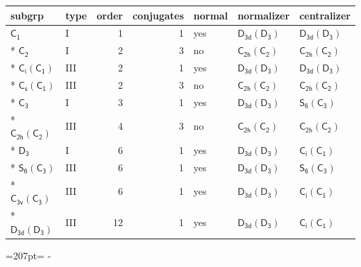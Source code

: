 \documentclass[10pt,a4paper]{article}
\newcommand{\needspace}[1]{\par\penalty-100\begingroup\dimen0=#1\relax\dimen2=\pagegoal
  \advance\dimen2-\pagetotal\ifdim\dimen0>\dimen2\relax\ifdim\dimen2>0pt\vfil\break\fi\fi
  \endgroup}
\numberwithin{equation}{section}
\newcommand{\grp}[1]{\mathsf{#1}}
\begin{document}
{\small\begin{longtable}{@{}llrrlll@{}}\toprule
subgrp & type & order & conjugates & normal & normalizer & centralizer\\\midrule\endhead
\bottomrule\endfoot\endlastfoot
\href{../../../rotation/data/pdf/C1.pdf}{$\grp{C_{1}}$} & I & 1 & 1 & yes & \href{D3d-D3.pdf}{$\grp{D_{3d}}(\grp{D_{3}})$} & \href{D3d-D3.pdf}{$\grp{D_{3d}}(\grp{D_{3}})$}\\*
\href{../../../rotation/data/pdf/C2.pdf}{$\grp{C_{2}}$} & I & 2 & 3 & no & \href{C2h-C2.pdf}{$\grp{C_{2h}}(\grp{C_{2}})$} & \href{C2h-C2.pdf}{$\grp{C_{2h}}(\grp{C_{2}})$}\\*
\href{S2-C1.pdf}{$\grp{C_{i}}(\grp{C_{1}})$} & III & 2 & 1 & yes & \href{D3d-D3.pdf}{$\grp{D_{3d}}(\grp{D_{3}})$} & \href{D3d-D3.pdf}{$\grp{D_{3d}}(\grp{D_{3}})$}\\*
\href{C1v-C1.pdf}{$\grp{C_{s}}(\grp{C_{1}})$} & III & 2 & 3 & no & \href{C2h-C2.pdf}{$\grp{C_{2h}}(\grp{C_{2}})$} & \href{C2h-C2.pdf}{$\grp{C_{2h}}(\grp{C_{2}})$}\\*
\href{../../../rotation/data/pdf/C3.pdf}{$\grp{C_{3}}$} & I & 3 & 1 & yes & \href{D3d-D3.pdf}{$\grp{D_{3d}}(\grp{D_{3}})$} & \href{S6-C3.pdf}{$\grp{S_{6}}(\grp{C_{3}})$}\\*
\href{C2h-C2.pdf}{$\grp{C_{2h}}(\grp{C_{2}})$} & III & 4 & 3 & no & \href{C2h-C2.pdf}{$\grp{C_{2h}}(\grp{C_{2}})$} & \href{C2h-C2.pdf}{$\grp{C_{2h}}(\grp{C_{2}})$}\\*
\href{../../../rotation/data/pdf/D3.pdf}{$\grp{D_{3}}$} & I & 6 & 1 & yes & \href{D3d-D3.pdf}{$\grp{D_{3d}}(\grp{D_{3}})$} & \href{S2-C1.pdf}{$\grp{C_{i}}(\grp{C_{1}})$}\\*
\href{S6-C3.pdf}{$\grp{S_{6}}(\grp{C_{3}})$} & III & 6 & 1 & yes & \href{D3d-D3.pdf}{$\grp{D_{3d}}(\grp{D_{3}})$} & \href{S6-C3.pdf}{$\grp{S_{6}}(\grp{C_{3}})$}\\*
\href{C3v-C3.pdf}{$\grp{C_{3v}}(\grp{C_{3}})$} & III & 6 & 1 & yes & \href{D3d-D3.pdf}{$\grp{D_{3d}}(\grp{D_{3}})$} & \href{S2-C1.pdf}{$\grp{C_{i}}(\grp{C_{1}})$}\\*
\href{D3d-D3.pdf}{$\grp{D_{3d}}(\grp{D_{3}})$} & III & 12 & 1 & yes & \href{D3d-D3.pdf}{$\grp{D_{3d}}(\grp{D_{3}})$} & \href{S2-C1.pdf}{$\grp{C_{i}}(\grp{C_{1}})$}\\
\bottomrule\end{longtable}}
\needspace{207pt}
\end{document}
